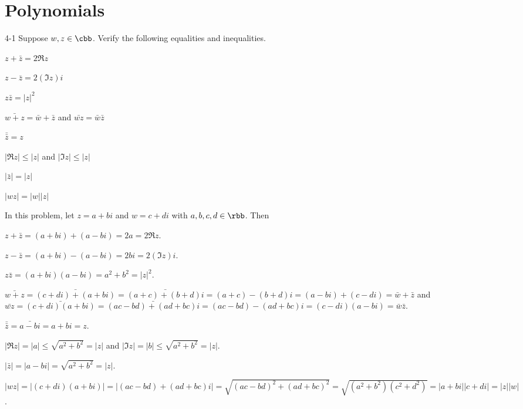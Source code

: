 \section{Polynomials}

\begingroup

\renewcommand{\thesubsection}{\thesection-}

\begin{exercise}{4-1}
    Suppose $w, z \in \cbb$.
	Verify the following equalities and inequalities.
    \begin{subexercises}
        \item $z + \bar{z} = 2 \Re z$
        \item $z - \bar{z} = 2(\Im z)i$
        \item $z\bar{z} = |z|^2$
        \item $\bar{w + z} = \bar{w} + \bar{z}$ and $\bar{wz} = \bar{w} \bar{z}$
        \item $\bar{\bar{z}} = z$
        \item $|\Re z| \leq |z|$ and $|\Im z| \leq |z|$
        \item $|\bar{z}| = |z|$
        \item $|wz| = |w| |z|$
    \end{subexercises}
\end{exercise}

\begin{sol}
    In this problem, let $z = a + bi$ and $w = c + di$ with $a, b, c, d \in \rbb$.
	Then
    \begin{subexercises}
        \item $z + \bar{z} = (a + bi) + (a - bi) = 2a = 2 \Re z$.
        \item $z - \bar{z} = (a + bi) - (a - bi) = 2bi = 2(\Im z)i$.
        \item $z\bar{z} = (a + bi)(a - bi) = a^2 + b^2 = |z|^2$.
        \item $\bar{w + z} = \bar{(c + di) + (a + bi)} = \bar{(a + c) + (b + d)i} = (a + c) - (b + d)i = (a - bi) + (c - di) = \bar{w} + \bar{z}$ and $\bar{wz} = \bar{(c + di)(a + bi)} = \bar{(ac - bd) + (ad + bc)i} = (ac - bd) - (ad + bc)i = (c - di)(a - bi) = \bar{w} \bar{z}$.
        \item $\bar{\bar{z}} = \bar{a - bi} = a + bi = z$.
        \item $|\Re z| = |a| \leq \sqrt{a^2 + b^2} = |z|$ and $|\Im z| = |b| \leq \sqrt{a^2 + b^2} = |z|$.
        \item $|\bar{z}| = |a - bi| = \sqrt{a^2 + b^2} = |z|$.
        \item $|wz| = |(c + di)(a + bi)| = |(ac - bd) + (ad + bc)i| = \sqrt{(ac - bd)^2 + (ad + bc)^2} = \sqrt{(a^2 + b^2)(c^2 + d^2)} = |a + bi| |c + di| = |z| |w|$. \qedhere
    \end{subexercises}
\end{sol}

